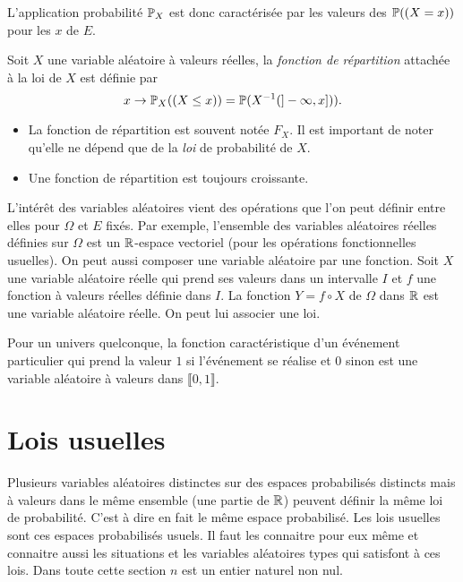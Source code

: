 L'application probabilité $\mathbb{P}_X$ est donc caractérisée par les valeurs des $\mathbb{P}((X=x))$ pour les $x$ de $E$. \newline
{}
\begin{defi}
Soit $X$ une variable aléatoire à valeurs réelles, la \emph{fonction de répartition} attachée à la loi de $X$ est définie par 
\begin{displaymath}
 x\rightarrow \mathbb{P}_X((X\leq x)) = \mathbb{P}(X^{-1}(]-\infty, x])).
\end{displaymath}
\end{defi}
\begin{rems}
\begin{itemize}
  \item La fonction de répartition est souvent notée $F_X$. Il est important de noter qu'elle ne dépend que de la \emph{loi} de probabilité de $X$.
  \item Une fonction de répartition est toujours croissante.
\end{itemize}
\end{rems}
L'intérêt des variables aléatoires vient des opérations que l'on peut définir entre elles pour $\Omega$ et $E$ fixés. Par exemple, l'ensemble des variables aléatoires réelles définies sur $\Omega$ est un $\mathbb{R}$-espace vectoriel (pour les opérations fonctionnelles usuelles).\newline
On peut aussi composer une variable aléatoire par une fonction.\newline
Soit $X$ une variable aléatoire réelle qui prend ses valeurs dans un intervalle $I$ et $f$ une fonction à valeurs réelles définie dans $I$. La fonction $Y=f\circ X$ de $\Omega$ dans $\mathbb{R}$ est une variable aléatoire réelle. On peut lui associer une loi.
\begin{exple}
  Pour un univers quelconque, la fonction caractéristique d'un événement particulier qui prend la valeur $1$ si l'événement se réalise et $0$ sinon est une variable aléatoire à valeurs dans $\llbracket 0, 1\rrbracket$.
\end{exple}

\section{Lois usuelles}
Plusieurs variables aléatoires distinctes sur des espaces probabilisés distincts mais à valeurs dans le même ensemble (une partie de $\mathbb{R}$) peuvent définir la même loi de probabilité. C'est à dire en fait le même espace probabilisé. Les lois usuelles sont ces espaces probabilisés usuels. Il faut les connaitre pour eux même et connaitre aussi les situations et les variables aléatoires types qui satisfont à ces lois.\newline
Dans toute cette section $n$ est un entier naturel non nul.
